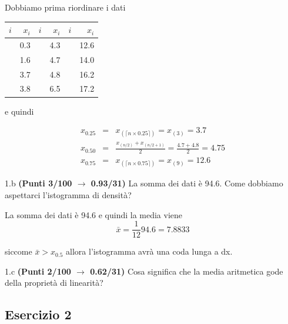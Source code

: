 \documentclass[
  11pt,
]{book}
\theoremstyle{mytheoremstyle}
\theoremstyle{mydefstyle}
\newenvironment{sol}
  {
  \begin{tcolorbox}[enhanced,breakable,arc=0.1mm,boxrule=1pt,colback=white,colframe=iblue,
  title=\bf \fontfamily{lmss}\selectfont \hspace{.5 cm} Soluzione,drop fuzzy shadow]

}{
\end{tcolorbox}
  }
\begin{document}
\begin{sol}

Dobbiamo prima riordinare i dati

\begin{table}[H]
\centering
\begin{tabular}{>{\raggedright\arraybackslash}p{3em}r>{\raggedright\arraybackslash}p{3em}r>{\raggedright\arraybackslash}p{3em}r}
\toprule
$i$ & $x_{i}$ & $i$ & $x_{i}$ & $i$ & $x_{i}$\\
\midrule
\cellcolor[HTML]{E6E6E6}{$(1)$} & 0.3 & \cellcolor[HTML]{E6E6E6}{$(5)$} & 4.3 & \cellcolor[HTML]{E6E6E6}{$(9)$} & 12.6\\
\cellcolor[HTML]{E6E6E6}{$(2)$} & 1.6 & \cellcolor[HTML]{E6E6E6}{$(6)$} & 4.7 & \cellcolor[HTML]{E6E6E6}{$(10)$} & 14.0\\
\cellcolor[HTML]{E6E6E6}{$(3)$} & 3.7 & \cellcolor[HTML]{E6E6E6}{$(7)$} & 4.8 & \cellcolor[HTML]{E6E6E6}{$(11)$} & 16.2\\
\cellcolor[HTML]{E6E6E6}{$(4)$} & 3.8 & \cellcolor[HTML]{E6E6E6}{$(8)$} & 6.5 & \cellcolor[HTML]{E6E6E6}{$(12)$} & 17.2\\
\bottomrule
\end{tabular}
\end{table}

e quindi

\begin{eqnarray*}
x_{0.25} &=& x_{(\lceil n\times0.25\rceil)}=x_{(3)}=3.7\\
x_{0.50} &=& \frac{x_{(n/2)}+x_{(n/2+1)}}{2}=\frac{4.7+4.8}{2}
=4.75\\
x_{0.75} &=& x_{(\lceil n\times0.75\rceil)}=x_{(9)}=12.6
\end{eqnarray*}

\end{sol}

1.b \textbf{(Punti 3/100 \(\rightarrow\) 0.93/31)} La somma dei dati è 94.6. Come dobbiamo aspettarci l'istogramma di densità?

\begin{sol}
La somma dei dati è 94.6 e quindi la media viene
\[
\bar x=\frac 1{12}94.6=7.8833
\]

siccome \(\bar x>x_{0.5}\) allora l'istogramma avrà una coda lunga a dx.

\end{sol}

1.c \textbf{(Punti 2/100 \(\rightarrow\) 0.62/31)} Cosa significa che la media aritmetica gode della proprietà di linearità?

\subsection{Esercizio 2}\label{esercizio-2-7}
\end{document}
